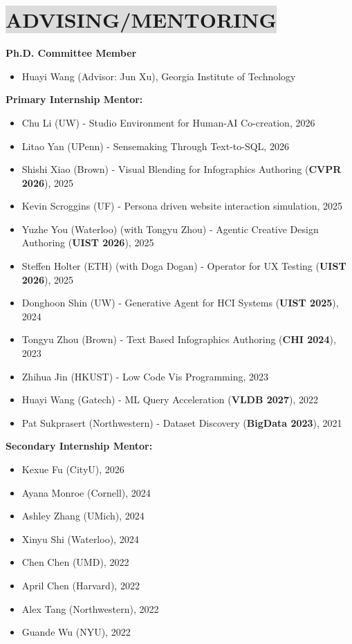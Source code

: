 \section*{
    \colorbox{gainsboro}{ADVISING/MENTORING}  
}
\textbf{Ph.D. Committee Member}
\vspace{-3mm}
\begin{itemize}[leftmargin=5mm,noitemsep,itemsep=0pt]
    \item Huayi Wang (Advisor: Jun Xu), Georgia Institute of Technology
\end{itemize}

\textbf{Primary Internship Mentor:}
\vspace{-3mm}
\begin{itemize}[leftmargin=5mm,noitemsep,itemsep=0pt]
    \item Chu Li (UW) - Studio Environment for Human-AI Co-creation, 2026
    \item Litao Yan (UPenn) - Sensemaking Through Text-to-SQL, 2026
    \item Shishi Xiao (Brown) - Visual Blending for Infographics Authoring (\textbf{CVPR 2026}), 2025
    \item Kevin Scroggins (UF) - Persona driven website interaction simulation, 2025
    \item Yuzhe You (Waterloo) (with Tongyu Zhou) - Agentic Creative Design Authoring (\textbf{UIST 2026}), 2025 
    \item Steffen Holter (ETH) (with Doga Dogan) - Operator for UX Testing (\textbf{UIST 2026}), 2025
    \item Donghoon Shin (UW) - Generative Agent for HCI Systems (\textbf{UIST 2025}), 2024
    \item Tongyu Zhou (Brown) - Text Based Infographics Authoring (\textbf{CHI 2024}), 2023
    \item Zhihua Jin (HKUST) - Low Code Vis Programming, 2023
    \item Huayi Wang (Gatech) - ML Query Acceleration (\textbf{VLDB 2027}), 2022
    \item Pat Sukprasert (Northwestern) - Dataset Discovery (\textbf{BigData 2023}), 2021
\end{itemize}

\textbf{Secondary Internship Mentor:}
\vspace{-3mm}
\begin{itemize}[leftmargin=5mm,noitemsep,itemsep=0pt]
    \item Kexue Fu (CityU), 2026
    \item Ayana Monroe (Cornell), 2024
    \item Ashley Zhang (UMich), 2024
    \item Xinyu Shi (Waterloo), 2024
    \item Chen Chen (UMD), 2022
    \item April Chen (Harvard), 2022
    \item Alex Tang (Northwestern), 2022
    \item Guande Wu (NYU), 2022
\end{itemize}
